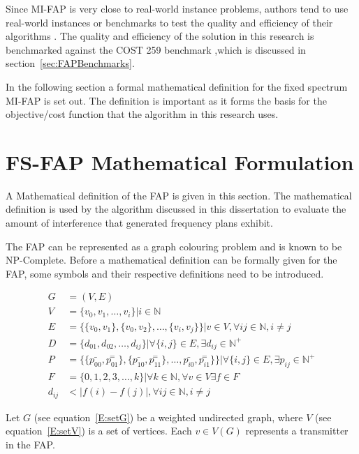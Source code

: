 Since \gls{MI-FAP} is very close to real-world instance problems, authors tend to use real-world instances or benchmarks to test the quality and efficiency of their algorithms \cite{Eisenblatter,MontemanniThesis}. The quality and efficiency of the solution in this research is benchmarked against the \gls{COST} 259 benchmark ,which is discussed in section~\ref{sec:FAPBenchmarks}.

In the following section a formal mathematical definition for the fixed spectrum \gls{MI-FAP} is set out. The definition is important as it forms the basis for the objective/cost function that the algorithm in this research uses.
 
\section{FS-FAP Mathematical Formulation}
\label{sec:FAPMathDef}
A Mathematical definition of the \gls{FAP} is given in this section. The mathematical definition is used by the algorithm discussed in this dissertation to evaluate the amount of interference that generated frequency plans exhibit.

The \gls{FAP} can be represented as a graph colouring problem and is known to be NP-Complete. Before a mathematical definition can be formally given for the \gls{FAP}, some symbols and their respective definitions need to be introduced.

\begin{align}
	G &= (V,E) \label{E:setG}\\
	V &= \{v_{0},v_{1},\ldots,v_{i}\} | i \in \mathbb{N} \label{E:setV}\\
	E &= \{\{v_0,v_1\},\{v_0,v_2\},\ldots,\{v_i,v_j\}\}|v \in V,\forall ij \in \mathbb{N},i \neq j \label{E:setE}\\
	D &= \{d_{01},d_{02},\ldots,d_{ij}\}| \forall\{i,j\} \in E, \exists d_{ij} \in \mathbb{N}^+ \label{E:setD}\\
	P &= \{\{\bar{p_{00}},\overset{=}{p_{01}}\},\{\bar{p_{10}},\overset{=}{p_{11}}\},\ldots,\bar{p_{i0}},\overset{=}{p_{i1}}\}\}| \forall \{i,j\} \in E,\exists p_{ij} \in \mathbb{N}^+ \label{E:setP}\\
	F &= \{0,1,2,3,\ldots,k\}| \forall k \in \mathbb{N},\forall v \in V \exists f \in F\label{E:setF}\\
	d_{ij} &< |f(i) - f(j)|, \forall ij \in \mathbb{N},i \neq j \label{E:interference}
\end{align}

Let $G$ (see equation~\ref{E:setG}) be a weighted undirected graph, where $V$ (see equation~\ref{E:setV}) is a set of vertices\cite{MontemanniThesis}. Each $v \in V(G)$ represents a transmitter in the \gls{FAP}\cite{MontemanniThesis}. 

